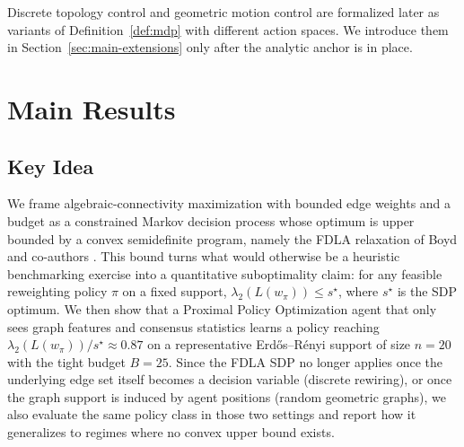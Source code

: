 \documentclass[letterpaper, 11 pt, journal, twoside]{IEEEtran}
\begin{document}
Discrete topology control and geometric motion control are
formalized later as variants of Definition~\ref{def:mdp} with
different action spaces. We introduce them in
Section~\ref{sec:main-extensions} only after the analytic anchor is
in place.

\section{Main Results}
\label{sec:main}

\subsection*{Key Idea}
\label{sec:key-idea}
We frame algebraic-connectivity maximization with bounded edge
weights and a budget as a constrained Markov decision process whose
optimum is upper bounded by a convex semidefinite program, namely
the FDLA relaxation of Boyd and co-authors
\cite{XiaoBoyd2004,Boyd2006,GhoshBoyd2006}. This bound turns what
would otherwise be a heuristic benchmarking exercise into a
quantitative suboptimality claim: for any feasible reweighting
policy $\pi$ on a fixed support,
$\lambda_2(L(w_\pi)) \le s^\star$, where $s^\star$ is the SDP
optimum. We then show that a Proximal Policy Optimization
\cite{Schulman2017} agent that only sees graph features and
consensus statistics learns a policy reaching
$\lambda_2(L(w_\pi))/s^\star \approx 0.87$ on a representative
Erd\H{o}s--R\'enyi support of size $n = 20$ with the tight budget
$B = 25$. Since the FDLA SDP no longer applies once the underlying
edge set itself becomes a decision variable (discrete rewiring), or
once the graph support is induced by agent positions (random
geometric graphs), we also evaluate the same policy class in those
two settings and report how it generalizes to regimes where no
convex upper bound exists.
\end{document}
